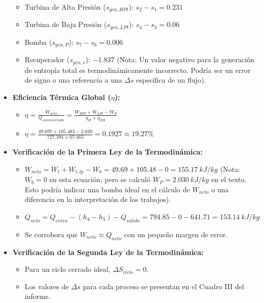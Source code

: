 \documentclass{beamer}
\begin{document}
\begin{frame}
\begin{multicols}{2}
\begin{itemize}
        \begin{itemize}
            \item Turbina de Alta Presión ($s_{gen,HPt}$): $s_2 - s_1 = 0.231$ 
            \item Turbina de Baja Presión ($s_{gen,LPt}$): $s_4 - s_3 = 0.06$ 
            \item Bomba ($s_{gen,P}$): $s_7 - s_6 = 0.006$ 
            \item Recuperador ($s_{gen,r}$): $-1.837$  (Nota: Un valor negativo para la generación de entropía total es termodinámicamente incorrecto. Podría ser un error de signo o una referencia a una $\Delta s$ específica de un flujo).
        \end{itemize}
        \item \textbf{Eficiencia Térmica Global ($\eta$):} 
        \begin{itemize}
            \item $\eta = \frac{W_{neto}}{Q_{suministrado}} = \frac{W_{HPt} + W_{LPt} - W_P}{q_H + q_{RH}}$ 
            \item $\eta = \frac{49.697 + 105.483 - 2.030}{727.394 + 67.463} = 0.1927 \approx 19.27\%$ 
        \end{itemize}
        \item \textbf{Verificación de la Primera Ley de la Termodinámica:} 
        \begin{itemize}
            \item $W_{neto} = W_t + W_{t,lp} - W_b = 49.69 + 105.48 - 0 = 155.17~kJ/kg$  (Nota: $W_b=0$ en esta ecuación, pero se calculó $W_P=2.030~kJ/kg$ en el texto. Esto podría indicar una bomba ideal en el cálculo de $W_{neto}$ o una diferencia en la interpretación de los trabajos).
            \item $Q_{neto} = Q_{entra} - (h_4 - h_5) - Q_{salida} = 794.85 - 0 - 641.71 = 153.14~kJ/kg$ 
            \item Se corrobora que $W_{neto} \approx Q_{neto}$ con un pequeño margen de error.
        \end{itemize}
        \item \textbf{Verificación de la Segunda Ley de la Termodinámica:} 
        \begin{itemize}
            \item Para un ciclo cerrado ideal, $\Delta S_{ciclo}=0$.
            \item Los valores de $\Delta s$ para cada proceso se presentan en el Cuadro III del informe.
        \end{itemize}
    \end{itemize}
    \end{multicols}
\end{frame}
\end{document}
